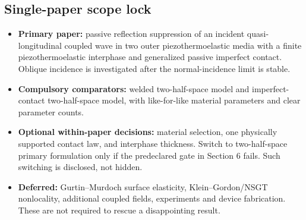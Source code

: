 \documentclass[11pt]{article}
\begin{document}
\subsection*{Single-paper scope lock}
\begin{itemize}
  \item \textbf{Primary paper:} passive reflection suppression of an incident
    quasi-longitudinal coupled wave in two outer piezothermoelastic media with a
    finite piezothermoelastic interphase and generalized passive imperfect
    contact. Oblique incidence is investigated after the normal-incidence limit is
    stable.
  \item \textbf{Compulsory comparators:} welded two-half-space model and
    imperfect-contact two-half-space model, with like-for-like material parameters
    and clear parameter counts.
  \item \textbf{Optional within-paper decisions:} material selection, one
    physically supported contact law, and interphase thickness. Switch to
    two-half-space primary formulation only if the predeclared gate in Section 6
    fails. Such switching is disclosed, not hidden.
  \item \textbf{Deferred:} Gurtin--Murdoch surface elasticity,
    Klein--Gordon/NSGT nonlocality, additional coupled fields, experiments and
    device fabrication. These are not required to rescue a disappointing result.
\end{itemize}
\end{document}
